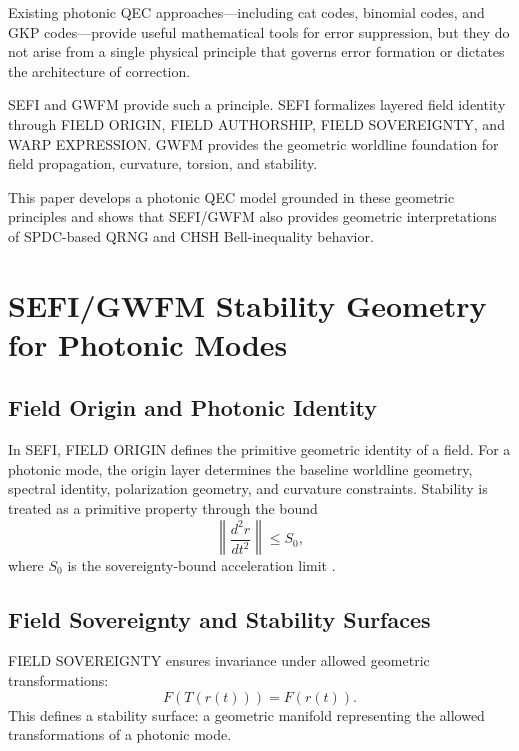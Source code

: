 \documentclass[aip, adv, reprint, superscriptaddress]{revtex4-2}
\begin{document}
Existing photonic QEC approaches---including cat codes, binomial codes, and GKP 
codes---provide useful mathematical tools for error suppression, but they do not arise 
from a single physical principle that governs error formation or dictates the architecture 
of correction.

SEFI \cite{DuttonSEFI} and GWFM \cite{DuttonGWFM} provide such a principle. SEFI 
formalizes layered field identity through FIELD ORIGIN, FIELD AUTHORSHIP, FIELD 
SOVEREIGNTY, and WARP EXPRESSION. GWFM provides the geometric worldline 
foundation for field propagation, curvature, torsion, and stability.

This paper develops a photonic QEC model grounded in these geometric principles and 
shows that SEFI/GWFM also provides geometric interpretations of SPDC-based QRNG 
and CHSH Bell-inequality behavior.

\section{SEFI/GWFM Stability Geometry for Photonic Modes}

\subsection{Field Origin and Photonic Identity}


In SEFI, FIELD ORIGIN defines the primitive geometric identity of a field. For a photonic 
mode, the origin layer determines the baseline worldline geometry, spectral identity, 
polarization geometry, and curvature constraints. Stability is treated as a primitive 
property through the bound
\begin{equation}
\left\| \frac{d^2 r}{dt^2} \right\| \le S_0,
\end{equation}
where $S_0$ is the sovereignty-bound acceleration limit \cite{DuttonSEFI}.

\subsection{Field Sovereignty and Stability Surfaces}

FIELD SOVEREIGNTY ensures invariance under allowed geometric transformations:
\begin{equation}
F(T(r(t))) = F(r(t)).
\end{equation}
This defines a stability surface: a geometric manifold representing the allowed 
transformations of a photonic mode.
\end{document}
